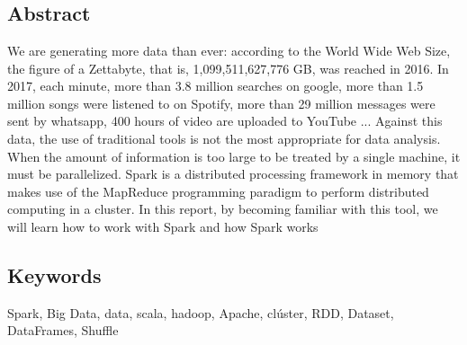 \chapter*{}

\section*{Abstract}

We are generating more data than ever: according to the World Wide Web Size, the figure of a Zettabyte, that is, 1,099,511,627,776 GB, was reached in 2016. In 2017, each minute, more than 3.8 million searches on google, more than 1.5 million songs were listened to on Spotify, more than 29 million messages were sent by whatsapp, 400 hours of video are uploaded to YouTube ... Against this data, the use of traditional tools is not the most appropriate for data analysis.\\

When the amount of information is too large to be treated by a single machine, it must be parallelized. Spark is a distributed processing framework in memory that makes use of the MapReduce programming paradigm to perform distributed computing in a cluster. In this report, by becoming familiar with this tool, we will learn how to work with Spark and how Spark works

{\setlength{\parskip}{30mm}
\section*{Keywords}
}
Spark, Big Data, data, scala, hadoop, Apache, clúster, RDD, Dataset, DataFrames, Shuffle